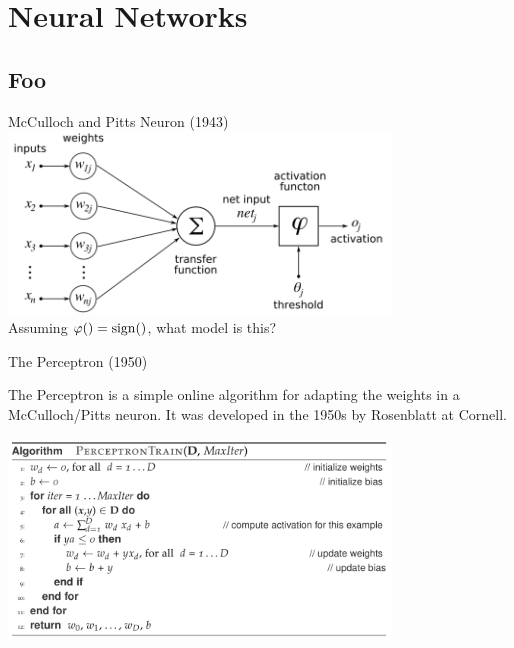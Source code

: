 \documentclass[serif,xcolor=pdftex,dvipsnames,table,hyperref={bookmarks=false}]{beamer}
\begin{document}
\section{Neural Networks}
\subsection{Foo}

\begin{frame}[t]{McCulloch and Pitts Neuron (1943)}
\center
\includegraphics[width=4in]{../Figures/pitts_neuron.png}\\
\pause Assuming $\varphi() = \operatorname*{sign}()$, what model is this?
\end{frame}

\begin{frame}[t]{The Perceptron (1950)}

The Perceptron is a simple online algorithm for adapting the weights in a
McCulloch/Pitts neuron. It was developed in the 1950s by Rosenblatt at Cornell.

\center
\includegraphics[width=4in]{../Figures/perceptron_algorithm.png}

\end{frame}
\end{document}
